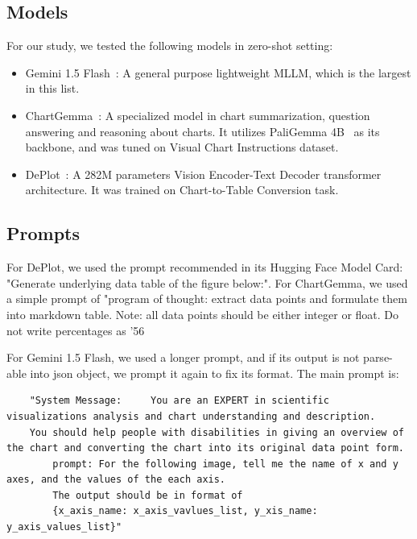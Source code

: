 \documentclass[
	letterpaper, %
]{jdf}
\begin{document}
\subsection{Models}\label{ssect:models}
For our study, we tested the following models in zero-shot setting:
\begin{itemize}
  \item Gemini 1.5 Flash~\cite{team2024gemini}: A general purpose lightweight MLLM, which is the largest in this list.
     \item ChartGemma~\cite{masry2024chartgemma}: A specialized model in chart summarization, question answering and reasoning about charts.
       It utilizes PaliGemma 4B~\cite{beyer2024paligemma} as its backbone, and was tuned on Visual Chart Instructions dataset.
     \item DePlot~\cite{liu2022deplot}: A 282M parameters Vision Encoder-Text Decoder transformer architecture.
         It was trained on Chart-to-Table Conversion task.
       \end{itemize}
       \subsection{Prompts}\label{ssect:prompts}
       For DePlot, we used the prompt recommended in its Hugging Face Model Card: "Generate underlying data table of the figure below:".
       For ChartGemma, we used a simple prompt of "program of thought: extract data points and formulate them into markdown table.
    Note: all data points should be either integer or float.
    Do not write percentages as '56%

    For Gemini 1.5 Flash, we used a longer prompt, and if its output is not parse-able into json object, we prompt it again to fix its format.
    The main prompt is: 
\begin{verbatim}
    "System Message:     You are an EXPERT in scientific visualizations analysis and chart understanding and description.
    You should help people with disabilities in giving an overview of the chart and converting the chart into its original data point form.
        prompt: For the following image, tell me the name of x and y axes, and the values of the each axis.
        The output should be in format of 
        {x_axis_name: x_axis_vavlues_list, y_xis_name: y_axis_values_list}"
        \end{verbatim}
\end{document}
